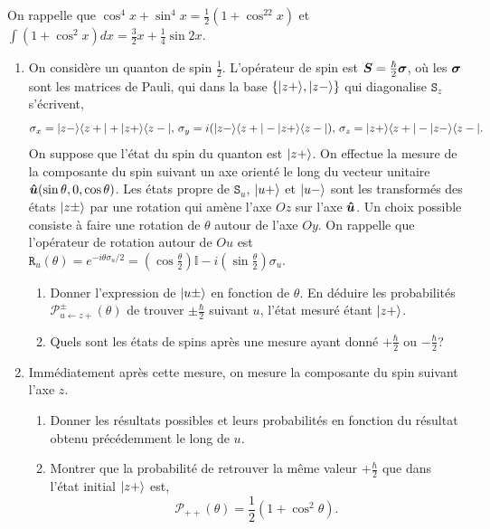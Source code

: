  On rappelle que $\cos^4x+\sin^4x=\frac{1}{2}(1+\cos^22x)$ et
$\int(1+\cos^2x)dx= \frac{3}{2}x+\frac{1}{4}\sin2x$.
\begin{enumerate}
\item On considère un quanton de spin $\frac{1}{2}$. L'opérateur de spin est
$\boldsymbol{S}=\frac{\hbar}{2}\boldsymbol{\sigma}$, où les $\boldsymbol{\sigma}$
sont les matrices de Pauli,
qui dans la base $\{\vert z+\rangle,\vert z-\rangle\}$ qui diagonalise $\mathtt{S}_z$
s'écrivent,
\begin{equation}
\sigma_x=\vert z-\rangle\langle z+\vert+\vert z+\rangle\langle z-\vert,\,\sigma_y=i(\vert z-\rangle\langle z+\vert
-\vert z+\rangle\langle z-\vert),\,\sigma_z=\vert z+\rangle\langle z+\vert-\vert z-\rangle\langle z-\vert.
\end{equation}
On suppose que l'état du spin du quanton est $\vert z+\rangle$. On effectue la mesure
de la composante du spin suivant un axe orienté le long du vecteur unitaire
$\boldsymbol{\hat{u}}(\sin\theta,0,\cos\theta)$. Les états propre de
$\mathtt{S}_u$,
$\vert u+\rangle$ et $\vert u-\rangle$ sont les transformés des états $\vert z\pm\rangle$ par une
rotation qui amène l'axe $Oz$ sur l'axe $\boldsymbol{\hat{u}}$. Un choix possible
consiste à faire une rotation de $\theta$ autour de l'axe $Oy$. On rappelle que
l'opérateur de rotation autour de $Ou$ est $\mathtt{R}_u(\theta)=
e^{-i\theta\sigma_{u}/2} =(\cos\frac{\theta}{2})\mathbb{I}
-i(\sin\frac{\theta}{2})\sigma_{u}$.

\begin{enumerate}
 \item Donner l'expression de $\vert u\pm\rangle$ en fonction de $\theta$. En déduire
les probabilités $\mathcal{P}^{\pm}_{u\leftarrow z+}(\theta)$ de trouver
$\pm\frac{\hbar}{2}$
suivant $u$, l'état mesuré étant $\vert z+\rangle$.

\item Quels sont les états de spins après une mesure ayant donné
$+\frac{\hbar}{2}$ ou $-\frac{\hbar}{2}$?
\end{enumerate}

\item Immédiatement après cette mesure, on mesure la composante du spin suivant
l'axe $z$.

\begin{enumerate}
 \item Donner les résultats possibles  et leurs probabilités en fonction du
résultat obtenu précédemment le long de $u$.

\item Montrer que la probabilité de retrouver la même valeur $+\frac{\hbar}{2}$
que dans l'état initial $\vert z+\rangle$ est,
\begin{equation}
  \mathcal{P}_{++}(\theta)=\frac{1}{2}(1+\cos^2\theta).
\end{equation}


\end{enumerate}
\end{enumerate}
